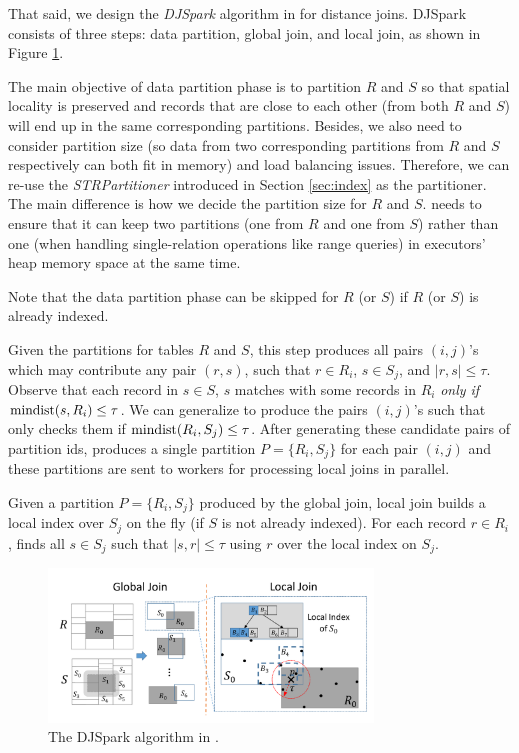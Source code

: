 That said, we design the \emph{DJSpark} algorithm in \name for
distance joins.  DJSpark consists of three steps: data partition,
global join, and local join, as shown in Figure \ref{fig:sjmrdis}.

 The main objective of data partition phase
is to partition $R$ and $S$ so that spatial locality is preserved and
records that are close to each other (from both $R$ and $S$) will end
up in the same corresponding partitions. Besides, we also need to
consider partition size (so data from two corresponding partitions
from $R$ and $S$ respectively can both fit in memory) and load
balancing issues. Therefore, we can re-use the \emph{STRPartitioner}
introduced in Section \ref{sec:index} as the partitioner. The main
difference is how we decide the partition size for $R$ and $S$. \name
needs to ensure that it can keep two partitions (one from $R$ and one
from $S$) rather than one (when handling single-relation operations like
range queries) in executors' heap memory space at the same time. 

Note that the data partition phase can be skipped for $R$ (or $S$) if
$R$ (or $S$) is already indexed.

 Given the partitions for tables $R$ and $S$,
this step produces all pairs $(i, j)$'s which may contribute any pair
$(r, s)$, such that $r\in R_i$, $s\in S_j$, and $|r, s|\le \tau$.
Observe that each record in $s\in S$, $s$ matches with some records in
$R_i$ {\em only if} $\operatorname{mindist}(s, R_i)\le \tau$. We can generalize to
produce the pairs $(i, j)$'s such that \name only checks them if
$\operatorname{mindist}(R_i, S_j)\le \tau$. After generating these candidate pairs
of partition ids, \name produces a single partition $P=\{R_i, S_j\}$
for each pair $(i, j)$ and these partitions are sent to workers for
processing local joins in parallel.

 Given a partition $P=\{R_i, S_j\}$ produced by
the global join, local join builds a local index over $S_j$ on the fly
(if $S$ is not already indexed). For each record $r\in R_i$, \name
finds all $s\in S_j$ such that $|s, r|\le \tau $ using $r$ over the
local index on $S_j$.

\begin{figure}
	\centering
	\includegraphics[width = 3.4in]{figs/SJMR-DIS}
	\vspace{-8mm}
	\caption{The DJSpark algorithm in \name.}
	\label{fig:sjmrdis}\vspace{-4mm}
\end{figure}

